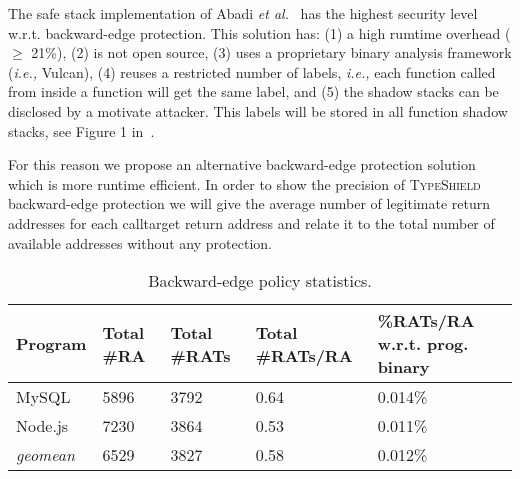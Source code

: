 The safe stack implementation of Abadi \textit{et al.}~\cite{abadi:cfi2} has the highest
security level~\cite{cfi:survey} w.r.t. backward-edge protection. This solution has:
(1) a high rumtime overhead ($\ge$ 21\%), 
(2) is not open source, 
(3) uses a proprietary binary analysis framework (\textit{i.e.,} Vulcan), 
(4) reuses a restricted number of labels, \textit{i.e.,} each function called from inside a function will get the same label, and
(5) the shadow stacks can be disclosed by a motivate attacker.
This labels will be stored in all function shadow stacks, see Figure 1 in~\cite{abadi:cfi2}. 

For this reason we propose an alternative backward-edge protection solution which is more runtime efficient.
In order to show the precision of \textsc{TypeShield} backward-edge protection we will give the average number of legitimate return addresses for each calltarget return address 
and relate it to the total number of available addresses without any protection.

\begin{table}[H]
\centering 
 \begin{tabular}{ l | p{.7cm}  | p{.9cm}  | p{1.0cm}  | p{1.8cm} } 
  \textbf{Program}  & Total \#RA    & Total \#RATs  & Total \#RATs/RA  & \%RATs/RA w.r.t. prog. binary \\\hline 
  MySQL             & 5896          & 3792          & 0.64             & 0.014\%                       \\
  Node.js           & 7230          & 3864          & 0.53             & 0.011\%                       \\
  \textit{geomean}  & 6529          & 3827          & 0.58             & 0.012\%                       \\\hline
\end{tabular}
\caption{Backward-edge policy statistics.}
\label{Backward-edge policy statistics.}
\vspace{-.5cm}
\end{table}

